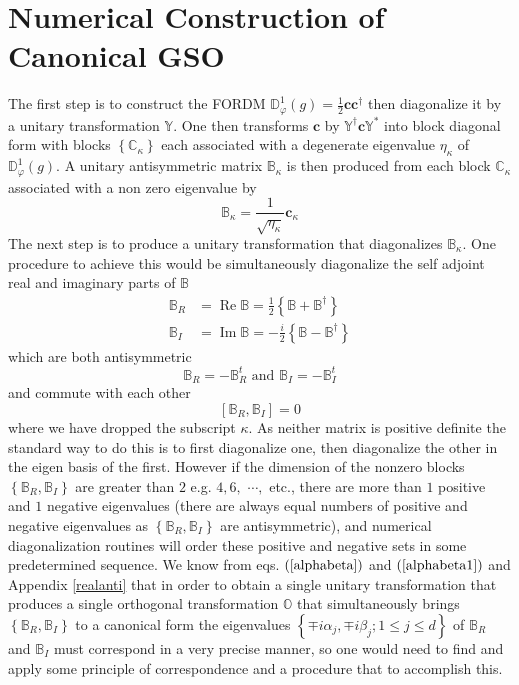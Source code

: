 \documentclass[aps,preprint]{revtex4}%
\begin{document}
\section{Numerical Construction of Canonical GSO\label{numerical}}

The first step is to construct the FORDM $\mathbb{D}_{\varphi}^{1}\left(
g\right)  =\frac{1}{2}\mathbf{cc}^{\dagger}$ then diagonalize it by a unitary
transformation $\mathbb{Y}$. One then transforms $\mathbf{c}$ by
$\mathbb{Y}^{\dagger}\mathbf{c}\mathbb{Y}^{\ast}$ into block diagonal form
with blocks $\left\{  \mathbb{C}_{\kappa}\right\}  $ each associated with a
degenerate eigenvalue $\eta_{\kappa}$ of $\mathbb{D}_{\varphi}^{1}\left(
g\right)  .$ A unitary antisymmetric matrix $\mathbb{B}_{\kappa}$ is then
produced from each block $\mathbb{C}_{\kappa}$ associated with a non zero
eigenvalue by
\begin{equation}
\mathbb{B}_{\kappa}=\frac{1}{\sqrt{\eta_{\kappa}}}\mathbf{c}_{\kappa}%
\end{equation}
The next step is to produce a unitary transformation that diagonalizes
$\mathbb{B}_{\kappa}$. One procedure to achieve this would be simultaneously
diagonalize the self adjoint real and imaginary parts of $\mathbb{B}$
\begin{align}
\mathbb{B}_{R}  &  =\operatorname{Re}\mathbb{B}=\frac{1}{2}\left\{
\mathbb{B+B}^{\dagger}\right\} \nonumber\\
\mathbb{B}_{I}  &  =\operatorname{Im}\mathbb{B}=-\frac{i}{2}\left\{
\mathbb{B-B}^{\dagger}\right\}
\end{align}
which are both antisymmetric
\begin{equation}
\mathbb{B}_{R}=-\mathbb{B}_{R}^{t}\text{ and }\mathbb{B}_{I}=-\mathbb{B}%
_{I}^{t}%
\end{equation}
and commute with each other
\begin{equation}
\left[  \mathbb{B}_{R},\mathbb{B}_{I}\right]  =0
\end{equation}
where we have dropped the subscript $\kappa$. As neither matrix is positive
definite the standard way to do this is to first diagonalize one, then
diagonalize the other in the eigen basis of the first. However if the
dimension of the nonzero blocks $\left\{  \mathbb{B}_{R},\mathbb{B}%
_{I}\right\}  $ are greater than $2$ e.g. $4,6,$ $\cdots,$ etc., there are
more than $1$ positive and $1$ negative eigenvalues (there are always equal
numbers of positive and negative eigenvalues as $\left\{  \mathbb{B}%
_{R},\mathbb{B}_{I}\right\}  $ are antisymmetric), and numerical
diagonalization routines will order these positive and negative sets in some
predetermined sequence. We know from eqs. $\left(  \ref{alphabeta}\right)  $
and $\left(  \ref{alphabeta1}\right)  $ and Appendix \ref{realanti} that in
order to obtain a single unitary transformation that produces a single
orthogonal transformation $\mathbb{O}$ that simultaneously brings $\left\{
\mathbb{B}_{R},\mathbb{B}_{I}\right\}  $ to a canonical form the eigenvalues
$\left\{  \mp i\alpha_{j},\mp i\beta_{j};1\leq j\leq d\right\}  $ of
$\mathbb{B}_{R}$ and $\mathbb{B}_{I}$ must correspond in a very precise
manner, so one would need to find and apply some principle of correspondence
and a procedure that to accomplish this.
\end{document}
